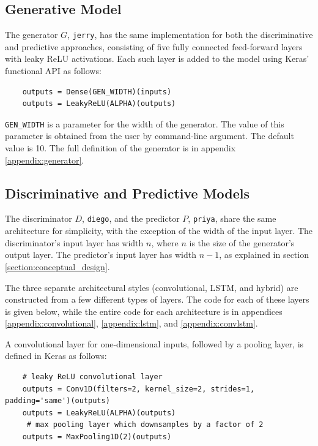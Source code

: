 \documentclass[12pt, titlepage]{report}
\theoremstyle{definition}
\begin{document}
\subsection{Generative Model}
The generator $G$, \texttt{jerry}, has the same implementation for both the discriminative and predictive approaches, consisting of five fully connected feed-forward layers with leaky ReLU activations. Each such layer is added to the model using Keras' functional API as follows:

\begin{verbatim}
    outputs = Dense(GEN_WIDTH)(inputs)
    outputs = LeakyReLU(ALPHA)(outputs)
\end{verbatim} 

\texttt{GEN_WIDTH} is a parameter for the width of the generator. The value of this parameter is obtained from the user by command-line argument. The default value is 10. The full definition of the generator is in appendix \ref{appendix:generator}.


\subsection{Discriminative and Predictive Models}
The discriminator $D$, \texttt{diego}, and the predictor $P$, \texttt{priya}, share the same architecture for simplicity, with the exception of the width of the input layer. The discriminator's input layer has width $n$, where $n$ is the size of the generator's output layer. The predictor's input layer has width $n - 1$, as explained in section \ref{section:conceptual_design}.

The three separate architectural styles (convolutional, LSTM, and hybrid) are constructed from a few different types of layers. The code for each of these layers is given below, while the entire code for each architecture is in appendices \ref{appendix:convolutional}, \ref{appendix:lstm}, and \ref{appendix:convlstm}.

A convolutional layer for one-dimensional inputs, followed by a pooling layer, is defined in Keras as follows:

\begin{verbatim}
    # leaky ReLU convolutional layer
    outputs = Conv1D(filters=2, kernel_size=2, strides=1, padding='same')(outputs)
    outputs = LeakyReLU(ALPHA)(outputs)
     # max pooling layer which downsamples by a factor of 2
    outputs = MaxPooling1D(2)(outputs)
\end{verbatim}
\end{document}
